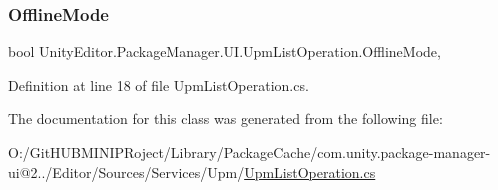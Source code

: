\subsubsection{\texorpdfstring{OfflineMode}{OfflineMode}}
{\footnotesize\ttfamily bool Unity\+Editor.\+Package\+Manager.\+U\+I.\+Upm\+List\+Operation.\+Offline\+Mode\hspace{0.3cm}{\ttfamily [get]}, {\ttfamily [set]}}



Definition at line 18 of file Upm\+List\+Operation.\+cs.



The documentation for this class was generated from the following file\+:\begin{DoxyCompactItemize}
\item 
O\+:/\+Git\+H\+U\+B\+M\+I\+N\+I\+P\+Roject/\+Library/\+Package\+Cache/com.\+unity.\+package-\/manager-\/ui@2../\+Editor/\+Sources/\+Services/\+Upm/\mbox{\hyperlink{_upm_list_operation_8cs}{Upm\+List\+Operation.\+cs}}\end{DoxyCompactItemize}
